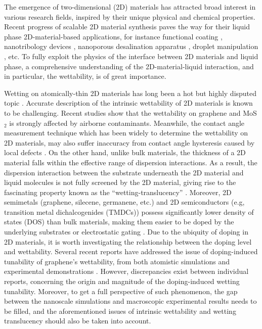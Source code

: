 \documentclass[aps,prl,reprint,groupedaddress,amsmath,amssymb, showpacs]{revtex4-1}
\begin{document}
The emergence of two-dimensional (2D) materials has attracted broad
interest in various research fields, inspired by their unique physical
and chemical properties. Recent progress of scalable 2D material
synthesis paves the way for their liquid phase 2D-material-based
applications, for instance functional coating
\cite{Prasai_2012,Rafiee_2010,Kim_2014}, nanotribology devices
\cite{Yin_2014,Tang_2016,Feng_2016}, nanoporous desalination apparatus
\cite{Surwade_2015,Rollings_2016,Jain_2015}, droplet manipulation
\cite{Hern_ndez_2013,Vijayarangamuthu_2015}, etc.  To fully exploit the
physics of the interface between 2D materials and liquid phase, a
comprehensive understanding of the 2D-material-liquid interaction, and in
particular, the wettability, is of great importance.


Wetting on atomically-thin 2D materials has long been a hot but highly
disputed topic
\cite{taherian2013what,Kozbial_2015,Parobek_2015,Govind_Rajan_2016}.
Accurate description of the intrinsic wettability of 2D materials is
known to be challenging. Recent studies show that the wettability on
graphene \cite{li_effect_2013,Xu_2013_withwhat,kozbial_study_2014} and
MoS\(_{\text{2}}\) \cite{Kozbial_2015,Chow_2015} is strongly affected by airborne
contaminants. Meanwhile, the contact angle measurement technique which
has been widely to determine the wettability on 2D materials, may also
suffer inaccuracy from contact angle hysteresis caused by local
defects \cite{raj_wettability_2013}.  On the other hand, unlike bulk
materials, the thickness of a 2D material falls within the effective
range of dispersion interactions.  As a result, the dispersion
interaction between the substrate underneath the 2D material and
liquid molecules is not fully screened by the 2D material, giving rise
to the fascinating property known as the ``wetting-translucency''
\cite{rafiee_wetting_2012,shih_breakdown_2012,shih_wetting_2013}.
Moreover, 2D semimetals (graphene, silecene, germanene, etc.) and 2D
semiconductors (e.g, transition metal dichalcogenides (TMDCs)) possess
significantly lower density of states (DOS) than bulk materials,
making them easier to be doped by the underlying substrates
\cite{Chen_2013,Varchon_2007,Giovannetti_2008} or electrostatic gating
\cite{Das_2008,Perera_2013}. Due to the ubiquity of doping in 2D
materials, it is worth investigating the relationship between the
doping level and wettability. Several recent reports have addressed
the issue of doping-induced tunability of graphene's wettability, from
both atomistic simulations
\cite{ostrowski_tunable_2014,ren_interfacial_2015,Taherian_2015,daub_electrowetting_2007}
and experimental demonstrations
\cite{hong_mechanism_2016,goniszewski_correlation_2016,ashraf_doping-induced_2016}.
However, discrepancies exist between individual reports, concerning
the origin and magnitude of the doping-induced wetting
tunability. Moreover, to get a full perspective of such phenomenon,
the gap between the nanoscale simulations and macroscopic experimental
results needs to be filled, and the aforementioned issues of intrinsic
wettability and wetting translucency should also be taken into account.
\end{document}
